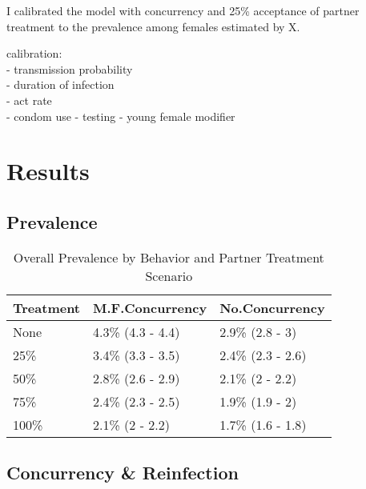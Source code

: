 \documentclass [11pt, proquest] {uwthesis}[2015/03/03]
\begin{document}
I calibrated the model with concurrency and 25\% acceptance of partner treatment to the prevalence among females estimated by X.

calibration:\\
- transmission probability\\
- duration of infection\\
- act rate\\
- condom use
- testing
- young female modifier

\hypertarget{results}{%
\section{Results}\label{results}}

\hypertarget{prevalence}{%
\subsection{Prevalence}\label{prevalence}}
\begin{table}

\caption{\label{tab:prev}Overall Prevalence by Behavior and Partner Treatment Scenario}
\centering
\begin{tabular}[t]{lll}
\toprule
Treatment & M.F.Concurrency & No.Concurrency\\
\midrule
None & 4.3\% (4.3 - 4.4) & 2.9\% (2.8 - 3)\\
25\% & 3.4\% (3.3 - 3.5) & 2.4\% (2.3 - 2.6)\\
50\% & 2.8\% (2.6 - 2.9) & 2.1\% (2 - 2.2)\\
75\% & 2.4\% (2.3 - 2.5) & 1.9\% (1.9 - 2)\\
100\% & 2.1\% (2 - 2.2) & 1.7\% (1.6 - 1.8)\\
\bottomrule
\end{tabular}
\end{table}
\hypertarget{concurrency-reinfection}{%
\subsection{Concurrency \& Reinfection}\label{concurrency-reinfection}}
\end{document}
